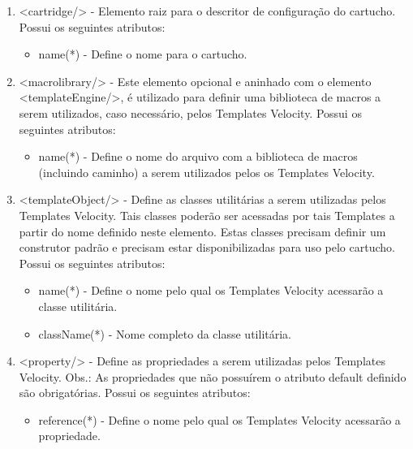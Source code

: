 \begin{enumerate}
	\item <cartridge/> - Elemento raiz para o descritor de configuração do
	cartucho. Possui os seguintes atributos:
	\begin{itemize}

		\item name(*) - Define o nome para o cartucho.

	\end{itemize}

	\item <macrolibrary/> - Este elemento opcional e aninhado com o elemento
	<templateEngine/>, é utilizado para definir uma biblioteca de macros a serem
	utilizados, caso necessário, pelos Templates Velocity. Possui os seguintes
	atributos:

	\begin{itemize}

		\item name(*) - Define o nome do arquivo com a biblioteca de macros (incluindo
		caminho) a serem utilizados pelos os Templates Velocity.

	\end{itemize}

	\item <templateObject/> - Define as classes utilitárias a serem utilizadas pelos
	Templates Velocity. Tais classes poderão ser acessadas por tais Templates a
	partir do nome definido neste elemento. Estas classes precisam definir um
	construtor padrão e precisam estar disponibilizadas para uso pelo cartucho.
	Possui os seguintes atributos:
	
	\begin{itemize}
		\item name(*) - Define o nome pelo qual os Templates Velocity acessarão a
		classe utilitária.
		
		\item className(*) - Nome completo da classe utilitária.
	\end{itemize}

	\item <property/> - Define as propriedades a serem utilizadas pelos Templates
	Velocity. Obs.: As propriedades que não possuírem o atributo default definido
	são obrigatórias. Possui os seguintes atributos:

	\begin{itemize}

		\item reference(*) - Define o nome pelo qual os Templates Velocity acessarão a
		propriedade.


\end{itemize}
\end{enumerate}
